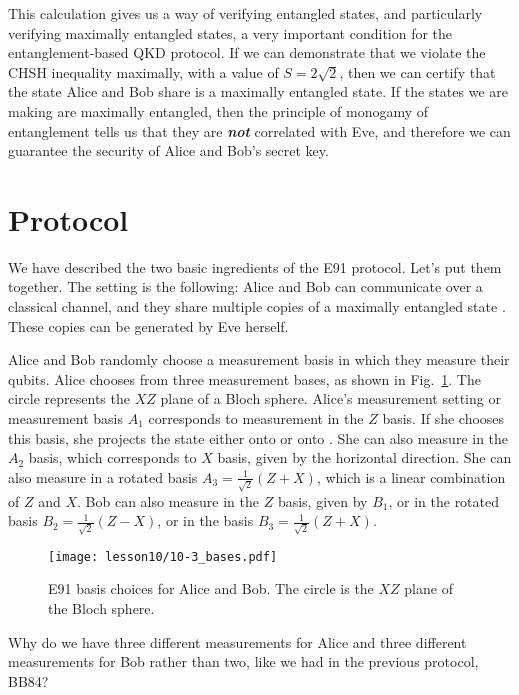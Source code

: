 This calculation gives us a way of verifying entangled states, and particularly verifying maximally entangled states, a very important condition for the entanglement-based QKD protocol.
If we can demonstrate that we violate the CHSH inequality maximally, with a value of $S = 2\sqrt{2}$, then we can certify that
the state Alice and Bob share is a maximally entangled state.
If the states we are making are maximally entangled, then the principle of monogamy of entanglement tells us that they are \textbf{\emph{not}} correlated with Eve, and therefore we can guarantee the security of Alice and Bob's secret key.



\section{Protocol}
\label{sec:E91-protocol}

We have described the two basic ingredients of the E91 protocol.
Let's put them together.
The setting is the following: Alice and Bob can communicate over a classical channel, and they share multiple copies of a maximally entangled state \ket{\Psi^+}.
These copies can be generated by Eve herself.

Alice and Bob randomly choose a measurement basis in which they measure their qubits.
Alice chooses from three measurement bases, as shown in Fig.~\ref{fig:e91-bases}.
The circle represents the $XZ$ plane of a Bloch sphere.
Alice's measurement setting or measurement basis $A_1$ corresponds to measurement in the $Z$ basis.
If she chooses this basis, she projects the state either onto  or onto .
She can also measure in the $A_2$ basis, which corresponds to $X$ basis, given by the horizontal direction.
She can also measure in a rotated basis $A_3=\frac{1}{\sqrt{2}}(Z+X)$, which is a linear combination of $Z$ and $X$.
Bob can also measure in the $Z$ basis, given by $B_1$, or in the rotated basis $B_2 = \frac{1}{\sqrt{2}}(Z-X)$, or in the basis $B_3=\frac{1}{\sqrt{2}}(Z+X)$.

\begin{figure}[H]
    \centering
    \texttt{[image: lesson10/10-3\_bases.pdf]}
    \caption[E91 measurement bases.]{E91 basis choices for Alice and Bob. The circle is the $XZ$ plane of the Bloch sphere.}
    \label{fig:e91-bases}
\end{figure}

Why do we have three different measurements for Alice and three different measurements for Bob rather than two, like we had in the previous protocol, BB84?

